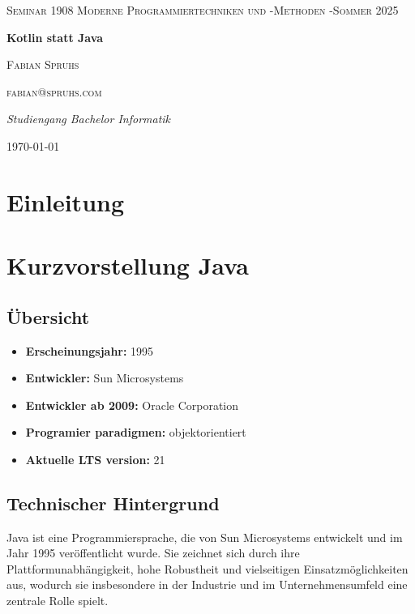 \documentclass[11pt]{article}
\begin{document}
    \begin{titlepage}
        \centering
        {\scshape\LARGE Seminar 1908 Moderne Programmiertechniken und -Methoden -Sommer 2025 \par}
        \vspace{1cm}
        {\huge\bfseries Kotlin statt Java\par}
        \vspace{1.5cm}
        {\scshape\Large Fabian Spruhs\par}
        {\scshape fabian@spruhs.com\par}
        \vspace{2cm}
        {\Large\itshape Studiengang Bachelor Informatik\par}
        \vspace{2cm}


        {\large \today\par}
    \end{titlepage}

    \tableofcontents
    \newpage


    \section{Einleitung}


    \section{Kurzvorstellung Java}

    \subsection{Übersicht}
    \begin{itemize}
        \item \textbf{Erscheinungsjahr:} 1995
        \item \textbf{Entwickler:} Sun Microsystems
        \item \textbf{Entwickler ab 2009:} Oracle Corporation
        \item \textbf{Programier paradigmen:} objektorientiert
        \item \textbf{Aktuelle LTS version:} 21
    \end{itemize}

    \subsection{Technischer Hintergrund}
    Java ist eine Programmiersprache, die von Sun Microsystems entwickelt und im Jahr 1995 veröffentlicht wurde.
    Sie zeichnet sich durch ihre Plattformunabhängigkeit, hohe Robustheit und vielseitigen Einsatzmöglichkeiten aus,
    wodurch sie insbesondere in der Industrie und im Unternehmensumfeld eine zentrale Rolle spielt.
\end{document}
